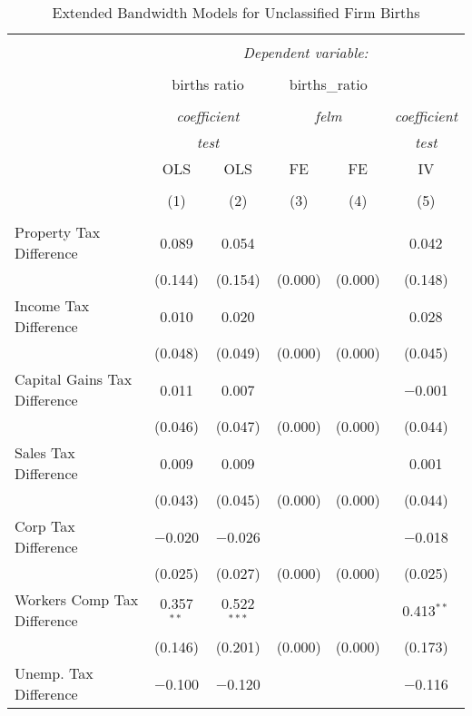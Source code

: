 
\begin{table}[!htbp] \centering 
  \caption{Extended Bandwidth Models for  Unclassified Firm Births} 
  \label{} 
\begin{tabular}{@{\extracolsep{5pt}}lccccc} 
\\[-1.8ex]\hline 
\hline \\[-1.8ex] 
 & \multicolumn{5}{c}{\textit{Dependent variable:}} \\ 
\cline{2-6} 
\\[-1.8ex] & \multicolumn{2}{c}{births ratio} & \multicolumn{2}{c}{births\_ratio} &   \\ 
\\[-1.8ex] & \multicolumn{2}{c}{\textit{coefficient}} & \multicolumn{2}{c}{\textit{felm}} & \textit{coefficient} \\ 
 & \multicolumn{2}{c}{\textit{test}} & \multicolumn{2}{c}{\textit{}} & \textit{test} \\ 
 & OLS & OLS & FE & FE & IV \\ 
\\[-1.8ex] & (1) & (2) & (3) & (4) & (5)\\ 
\hline \\[-1.8ex] 
 Property Tax Difference & 0.089 & 0.054 &  &  & 0.042 \\ 
  & (0.144) & (0.154) & (0.000) & (0.000) & (0.148) \\ 
  Income Tax Difference & 0.010 & 0.020 &  &  & 0.028 \\ 
  & (0.048) & (0.049) & (0.000) & (0.000) & (0.045) \\ 
  Capital Gains Tax Difference & 0.011 & 0.007 &  &  & $-$0.001 \\ 
  & (0.046) & (0.047) & (0.000) & (0.000) & (0.044) \\ 
  Sales Tax Difference & 0.009 & 0.009 &  &  & 0.001 \\ 
  & (0.043) & (0.045) & (0.000) & (0.000) & (0.044) \\ 
  Corp Tax Difference & $-$0.020 & $-$0.026 &  &  & $-$0.018 \\ 
  & (0.025) & (0.027) & (0.000) & (0.000) & (0.025) \\ 
  Workers Comp Tax Difference & 0.357$^{**}$ & 0.522$^{***}$ &  &  & 0.413$^{**}$ \\ 
  & (0.146) & (0.201) & (0.000) & (0.000) & (0.173) \\ 
  Unemp. Tax Difference & $-$0.100 & $-$0.120 &  &  & $-$0.116 \\ 

\end{tabular}
\end{table}
